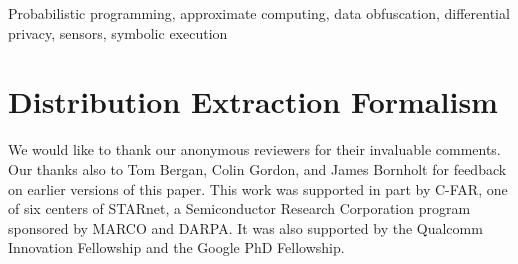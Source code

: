 \documentclass{sigplanconf}
\begin{document}
\keywords
Probabilistic programming,
approximate computing,
data obfuscation,
differential privacy,
sensors,
symbolic execution





\section{Distribution Extraction Formalism}
\label{sec:semantics}
\def\expandedversion{0}







\acks

We would like to thank our anonymous reviewers for their invaluable comments.
Our thanks also to Tom Bergan, Colin Gordon, and James Bornholt for feedback
on earlier versions of this paper.
This work was supported in part by C-FAR, one of six centers of STARnet, a
Semiconductor Research Corporation program sponsored by MARCO and DARPA.
It was also supported by the Qualcomm Innovation Fellowship and the Google PhD
Fellowship.



\end{document}
